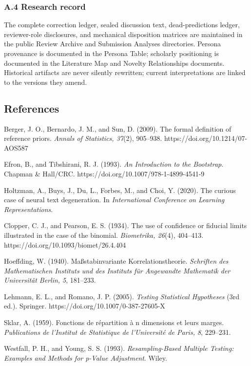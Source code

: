 \documentclass[
  11pt]{article}
\begin{document}
\subsubsection{A.4 Research record}\label{a.4-research-record}

The complete correction ledger, sealed discussion text, dead-predictions
ledger, reviewer-role disclosures, and mechanical disposition matrices
are maintained in the public Review Archive and Submission Analyses
directories. Persona provenance is documented in the Persona Table;
scholarly positioning is documented in the Literature Map and Novelty
Relationships documents. Historical artifacts are never silently
rewritten; current interpretations are linked to the versions they amend.

\subsection{References}\label{references}

\begingroup
\small
\setlength{\parskip}{0.30em}

Berger, J. O., Bernardo, J. M., and Sun, D. (2009). The formal
definition of reference priors. \emph{Annals of Statistics, 37}(2),
905--938. https://doi.org/10.1214/07-AOS587

Efron, B., and Tibshirani, R. J. (1993). \emph{An Introduction to the
Bootstrap}. Chapman \& Hall/CRC.
https://doi.org/10.1007/978-1-4899-4541-9

Holtzman, A., Buys, J., Du, L., Forbes, M., and Choi, Y. (2020). The
curious case of neural text degeneration. In \emph{International
Conference on Learning Representations}.

Clopper, C. J., and Pearson, E. S. (1934). The use of confidence or
fiducial limits illustrated in the case of the binomial.
\emph{Biometrika, 26}(4), 404--413.
https://doi.org/10.1093/biomet/26.4.404

Hoeffding, W. (1940). Maßstabinvariante Korrelationstheorie.
\emph{Schriften des Mathematischen Instituts und des Instituts für
Angewandte Mathematik der Universität Berlin, 5}, 181--233.

Lehmann, E. L., and Romano, J. P. (2005). \emph{Testing Statistical
Hypotheses} (3rd ed.). Springer. https://doi.org/10.1007/0-387-27605-X

Sklar, A. (1959). Fonctions de répartition à n dimensions et leurs
marges. \emph{Publications de l'Institut de Statistique de l'Université
de Paris, 8}, 229--231.

Westfall, P. H., and Young, S. S. (1993). \emph{Resampling-Based
Multiple Testing: Examples and Methods for p-Value Adjustment}. Wiley.
\end{document}
